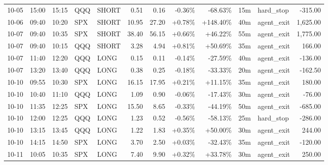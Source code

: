 \documentclass[11pt,a4paper,twoside]{article}
\begin{document}
\begin{center}
\begin{longtable}{>{\color{txtmain}}l l l l l r r r r r >{\color{txtmain}}l r}
10-05 & 15:00 & 15:15 & QQQ & SHORT & 0.51 & 0.16 & \textcolor{lossred}{-0.36\%} & \textcolor{lossred}{-68.63\%} & 15m & hard\_stop & \textcolor{lossred}{-315.00} \\
10-06 & 09:40 & 10:20 & SPX & SHORT & 10.95 & 27.20 & \textcolor{wingreen}{+0.78\%} & \textcolor{wingreen}{+148.40\%} & 40m & agent\_exit & \textcolor{wingreen}{1,625.00} \\
10-07 & 09:40 & 10:35 & SPX & SHORT & 38.40 & 56.15 & \textcolor{wingreen}{+0.66\%} & \textcolor{wingreen}{+46.22\%} & 55m & agent\_exit & \textcolor{wingreen}{1,775.00} \\
10-07 & 09:40 & 10:15 & QQQ & SHORT & 3.28 & 4.94 & \textcolor{wingreen}{+0.81\%} & \textcolor{wingreen}{+50.69\%} & 35m & agent\_exit & \textcolor{wingreen}{166.00} \\
10-07 & 11:40 & 12:20 & QQQ & LONG & 0.15 & 0.11 & \textcolor{lossred}{-0.14\%} & \textcolor{lossred}{-27.59\%} & 40m & agent\_exit & \textcolor{lossred}{-136.00} \\
10-07 & 13:20 & 13:40 & QQQ & LONG & 0.38 & 0.25 & \textcolor{lossred}{-0.18\%} & \textcolor{lossred}{-33.33\%} & 20m & agent\_exit & \textcolor{lossred}{-162.50} \\
10-10 & 09:55 & 10:30 & SPX & LONG & 16.15 & 17.95 & \textcolor{wingreen}{+0.21\%} & \textcolor{wingreen}{+11.15\%} & 35m & agent\_exit & \textcolor{wingreen}{180.00} \\
10-10 & 10:40 & 11:10 & QQQ & LONG & 1.09 & 0.90 & \textcolor{lossred}{-0.06\%} & \textcolor{lossred}{-17.43\%} & 30m & agent\_exit & \textcolor{lossred}{-76.00} \\
10-10 & 11:35 & 12:25 & SPX & LONG & 15.50 & 8.65 & \textcolor{lossred}{-0.33\%} & \textcolor{lossred}{-44.19\%} & 50m & agent\_exit & \textcolor{lossred}{-685.00} \\
10-10 & 12:00 & 12:25 & QQQ & LONG & 1.23 & 0.52 & \textcolor{lossred}{-0.56\%} & \textcolor{lossred}{-58.13\%} & 25m & hard\_stop & \textcolor{lossred}{-286.00} \\
10-10 & 13:15 & 13:45 & QQQ & LONG & 1.22 & 1.83 & \textcolor{wingreen}{+0.35\%} & \textcolor{wingreen}{+50.00\%} & 30m & agent\_exit & \textcolor{wingreen}{244.00} \\
10-10 & 14:15 & 14:50 & SPX & LONG & 3.70 & 2.50 & \textcolor{wingreen}{+0.03\%} & \textcolor{lossred}{-32.43\%} & 35m & agent\_exit & \textcolor{lossred}{-120.00} \\
10-11 & 10:05 & 10:35 & SPX & LONG & 7.40 & 9.90 & \textcolor{wingreen}{+0.32\%} & \textcolor{wingreen}{+33.78\%} & 30m & agent\_exit & \textcolor{wingreen}{250.00} \\

\end{longtable}
\end{center}
\end{document}
